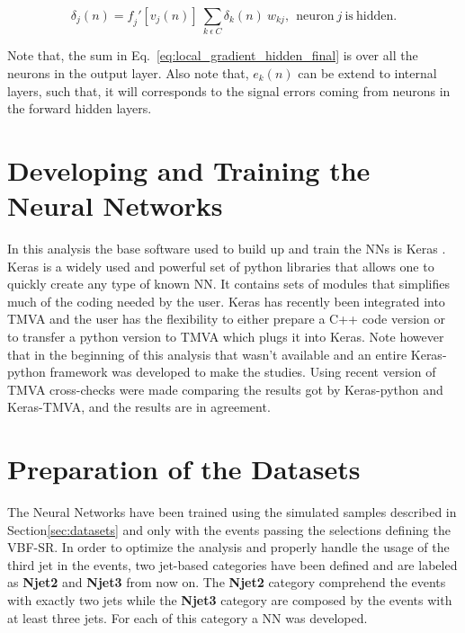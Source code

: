 \begin{equation}
\label{eq:local_gradient_hidden_final}
\delta_{j}(n) = \mathit{f}_{j}'[v_{j}(n)] ~ \sum_{k~\epsilon~C} \delta_{k}(n) ~ w_{kj},~~\mathrm{neuron}~j~\mathrm{is~hidden}.
\end{equation}

Note that, the sum in Eq.~\ref{eq:local_gradient_hidden_final} is over all the neurons in the output layer. Also note that, $e_{k}(n)$ can be extend to internal layers, such that, it will corresponds to the signal errors coming from neurons in the forward hidden layers.


\section{Developing and Training the Neural Networks}
\label{sec:developing_training_neural_networks}
In this analysis the base software used to build up and train the NNs
is Keras \cite{bib:KerasWebPage}. Keras is a widely used and powerful set of python libraries that allows one to quickly create any type of known NN. It contains sets of modules that simplifies much of the coding needed by the user. Keras has recently been integrated into TMVA \cite{bib:JPhysConfSer_898_072046_2017} and the user has the flexibility to either prepare a C++ code version or to transfer a python version to TMVA which plugs it into Keras. Note however that in the beginning of this analysis that wasn't available and an entire Keras-python framework was developed to make the studies. Using recent version of TMVA cross-checks were made comparing the results got by Keras-python and Keras-TMVA, and the results are in agreement.

\section{Preparation of the Datasets}
\label{subsec:datasets_preparation}
The Neural Networks have been trained using the simulated samples described in Section\ref{sec:datasets} and only with the events passing the selections defining the VBF-SR. In order to optimize the analysis and properly handle the usage of the third jet in the events, two jet-based categories have been defined and are labeled as \textbf{Njet2} and \textbf{Njet3} from now on. The \textbf{Njet2} category comprehend the events with exactly two jets while the \textbf{Njet3} category are composed by the events with at least three jets. For each of this category a NN was developed.

